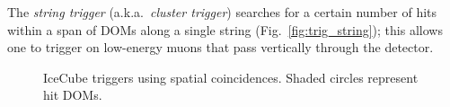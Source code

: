 The \emph{string trigger} (a.k.a.~\emph{cluster trigger}) searches for a
certain number of hits within a span of DOMs along a single
string (Fig.~\ref{fig:trig_string}); this allows one to trigger on
low-energy muons that pass vertically 
through the detector.  

\begin{figure}[ht]
  \centering
  \quad
  \caption{IceCube triggers using spatial coincidences.  Shaded circles represent hit DOMs.}
\end{figure}


